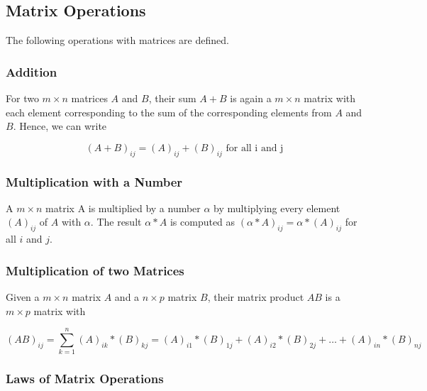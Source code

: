 \documentclass[]{book}
\theoremstyle{definition}
\theoremstyle{definition}
\theoremstyle{definition}
\theoremstyle{remark}
\begin{document}
\hypertarget{intro-linalg-matrix-operation}{%
\subsection{Matrix Operations}\label{intro-linalg-matrix-operation}}

The following operations with matrices are defined.

\hypertarget{intro-linalg-matrix-addition}{%
\subsubsection{Addition}\label{intro-linalg-matrix-addition}}

For two \(m\times n\) matrices \(A\) and \(B\), their sum \(A+B\) is again a \(m\times n\) matrix with each element corresponding to the sum of the corresponding elements from \(A\) and \(B\). Hence, we can write

\[(A+B)_{ij} = (A)_{ij} + (B)_{ij} \text{ for all i and j}\]

\hypertarget{intro-linalg-matrix-multiplication-with-number}{%
\subsubsection{Multiplication with a Number}\label{intro-linalg-matrix-multiplication-with-number}}

A \(m\times n\) matrix A is multiplied by a number \(\alpha\) by multiplying every element \((A)_{ij}\) of \(A\) with \(\alpha\). The result \(\alpha * A\) is computed as \((\alpha * A)_{ij} = \alpha * (A)_{ij}\) for all \(i\) and \(j\).

\hypertarget{intro-linalg-multiplication-two-matrices}{%
\subsubsection{Multiplication of two Matrices}\label{intro-linalg-multiplication-two-matrices}}

Given a \(m\times n\) matrix \(A\) and a \(n\times p\) matrix \(B\), their matrix product \(AB\) is a \(m\times p\) matrix with

\[ (AB)_{ij} = \sum_{k=1}^n (A)_{ik} * (B)_{kj} = (A)_{i1} * (B)_{1j} + (A)_{i2} * (B)_{2j} + \ldots + (A)_{in} * (B)_{nj}\]

\hypertarget{intro-linalg-laws-matrix-operations}{%
\subsubsection{Laws of Matrix Operations}\label{intro-linalg-laws-matrix-operations}}
\end{document}
